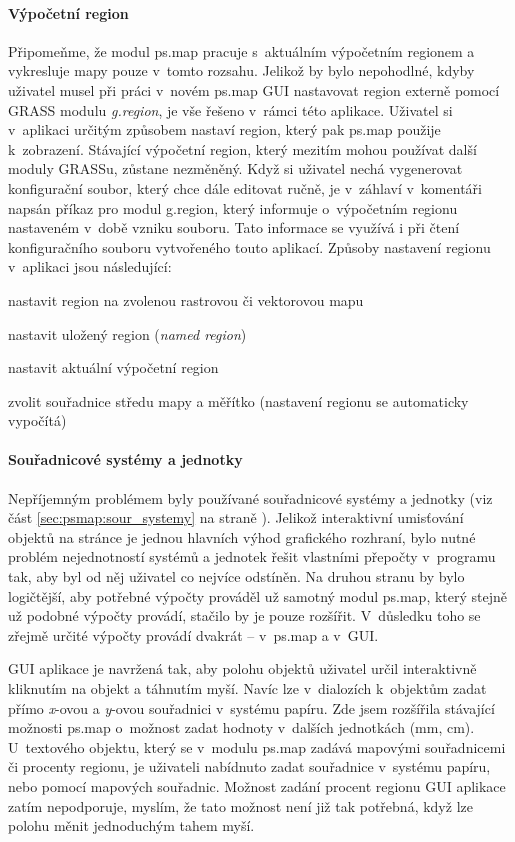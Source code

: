 \documentclass[a4paper,12pt,draft]{article}
\begin{document}
\paragraph*{Výpočetní region} Připomeňme, že modul ps.map
pracuje s~aktuálním výpočet\-ním regionem a vykresluje mapy pouze v~tomto
rozsahu. Jelikož by bylo nepohodlné, kdyby uživatel musel při práci
v~novém ps.map GUI nastavovat region externě pomocí GRASS modulu
\emph{g.region}, je vše řešeno v~rámci této aplikace. Uživatel si
v~aplikaci určitým způsobem nastaví region, který pak ps.map
použije k~zobrazení. Stávající výpočetní region, který mezitím
mohou používat další moduly GRASSu, zůstane nezměněný. Když si
uživatel nechá vygenerovat konfigurační soubor, který chce dále
editovat ručně, je v~záhlaví v~komentáři napsán příkaz pro modul
g.region, který informuje o~výpočetním regionu nastaveném v~době
vzniku souboru. Tato informace se využívá i při čtení konfiguračního
souboru vytvořeného touto aplikací.  Způsoby nastavení regionu v~aplikaci jsou
následující:
\begin{enumerate*}
    \item nastavit region na zvolenou rastrovou či vektorovou mapu
    \item nastavit uložený region (\emph{named region})
    \item nastavit aktuální výpočetní region
    \item zvolit souřadnice středu mapy a měřítko (nastavení regionu
    se automaticky vypočítá)
\end{enumerate*}


\paragraph*{Souřadnicové systémy a jednotky} Nepříjemným problémem
byly používané souřadnicové systémy a jednotky (viz část
\ref{sec:psmap:sour_systemy} na straně \pageref{sec:psmap:sour_systemy}).
 Jelikož interaktivní umisťování objektů na stránce je jednou hlavních
 výhod grafického rozhraní, bylo nutné problém nejednotností systémů
 a jednotek řešit vlastními přepočty v~programu tak, aby byl od něj
 uživatel co nejvíce odstíněn. Na druhou stranu by bylo logičtější,
 aby potřebné výpočty prováděl už samotný modul ps.map,
 který stejně už podobné výpočty provádí, stačilo by je pouze
 rozšířit. V~důsledku toho se zřejmě určité výpočty provádí
 dvakrát -- v~ps.map a v~GUI.

 GUI aplikace je navržená tak, aby polohu objektů uživatel určil
 interaktivně kliknutím na objekt a táhnutím myší. Navíc lze
 v~dialozích k~objektům zadat přímo \emph{x}-ovou a \emph{y}-ovou
 souřadnici v~systému papíru. Zde jsem rozšířila stávající možnosti
ps.map o~možnost zadat hodnoty v~dalších jednotkách (mm, cm).
 U~textového objektu, který se v~modulu ps.map zadává mapovými
 souřadnicemi či procenty regionu, je uživateli nabídnuto
 zadat souřadnice v~systému papíru, nebo pomocí mapových
 souřadnic. Možnost zadání procent regionu GUI aplikace zatím nepodporuje,
 myslím, že tato možnost není již tak potřebná, když lze polohu
 měnit jednoduchým tahem myší.
\end{document}
